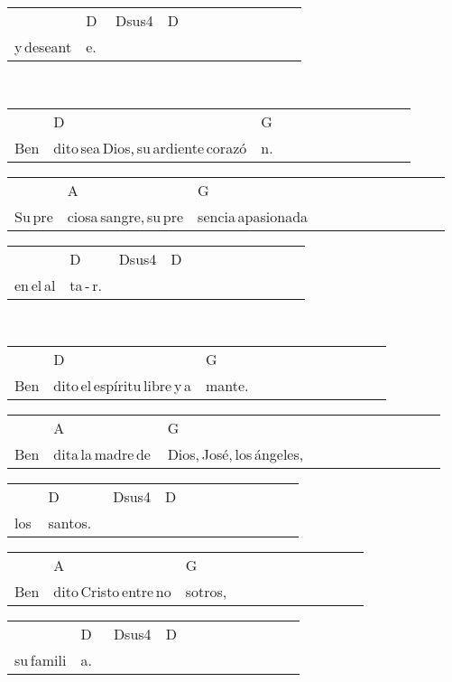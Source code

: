 \begin{multicols}{2}
\begin{minipage}{\columnwidth}
\noindent
\begin{tabular}{llllllllllll}
&D&Dsus4&D\\
y\,deseant&e.\,\,&\,\,\,&
\end{tabular}
\end{minipage}\\

\noindent
\begin{minipage}{\columnwidth}
\noindent
\noindent
\begin{tabular}{llllllllllll}
&D&G\\
Ben&dito\,sea\,Dios,\,su\,ardiente\,corazó&n.
\end{tabular}

\noindent
\begin{tabular}{llllllllllll}
&A&G\\
Su\,pre&ciosa\,sangre,\,su\,pre&sencia\,apasionada
\end{tabular}

\noindent
\begin{tabular}{llllllllllll}
&D&Dsus4&D\\
en\,el\,al&ta\,-\,r.\,&\,\,\,&
\end{tabular}
\end{minipage}\\

\noindent
\begin{minipage}{\columnwidth}
\noindent
\noindent
\begin{tabular}{llllllllllll}
&D&G\\
Ben&dito\,el\,espíritu\,libre\,y\,a&mante.
\end{tabular}

\noindent
\begin{tabular}{llllllllllll}
&A&G\\
Ben&dita\,la\,madre\,de\,&Dios,\,José,\,los\,ángeles,
\end{tabular}

\noindent
\begin{tabular}{llllllllllll}
&D&Dsus4&D\\
los\,&santos.\,\,\,&\,\,\,&
\end{tabular}

\noindent
\begin{tabular}{llllllllllll}
&A&G\\
Ben&dito\,Cristo\,entre\,no&sotros,
\end{tabular}

\noindent
\begin{tabular}{llllllllllll}
&D&Dsus4&D\\
su\,famili&a.\,\,\,&\,\,\,&
\end{tabular}
\end{minipage}\\

\end{multicols}